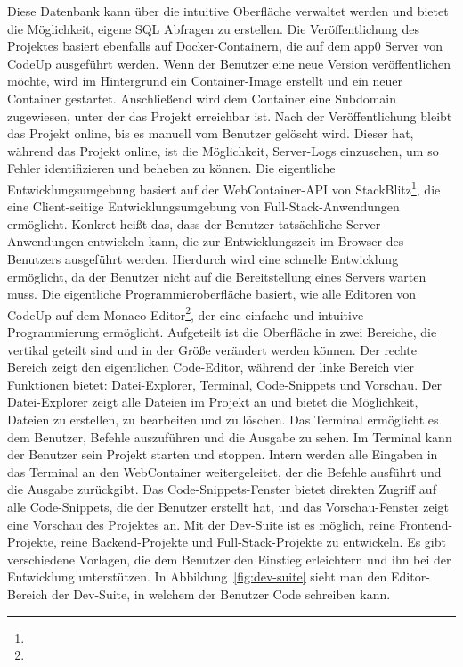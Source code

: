 \documentclass[main.tex]{subfiles}
\begin{document}
    Diese Datenbank kann über die intuitive Oberfläche verwaltet werden und bietet die Möglichkeit, eigene SQL Abfragen zu erstellen.
    Die Veröffentlichung des Projektes basiert ebenfalls auf Docker-Containern, die auf dem app0 Server von CodeUp ausgeführt werden.
    Wenn der Benutzer eine neue Version veröffentlichen möchte, wird im Hintergrund ein Container-Image erstellt und ein neuer Container gestartet.
    Anschließend wird dem Container eine Subdomain zugewiesen, unter der das Projekt erreichbar ist.
    Nach der Veröffentlichung bleibt das Projekt online, bis es manuell vom Benutzer gelöscht wird.
    Dieser hat, während das Projekt online, ist die Möglichkeit, Server-Logs einzusehen, um so Fehler identifizieren und beheben zu können.
    Die eigentliche Entwicklungsumgebung basiert auf der WebContainer-API von StackBlitz\footnote{}, die eine Client-seitige Entwicklungsumgebung von Full-Stack-Anwendungen ermöglicht.
    Konkret heißt das, dass der Benutzer tatsächliche Server-Anwendungen entwickeln kann, die zur Entwicklungszeit im Browser des Benutzers ausgeführt werden.
    Hierdurch wird eine schnelle Entwicklung ermöglicht, da der Benutzer nicht auf die Bereitstellung eines Servers warten muss.
    Die eigentliche Programmieroberfläche basiert, wie alle Editoren von CodeUp auf dem Monaco-Editor\footnote{}, der eine einfache und intuitive Programmierung ermöglicht.
    Aufgeteilt ist die Oberfläche in zwei Bereiche, die vertikal geteilt sind und in der Größe verändert werden können.
    Der rechte Bereich zeigt den eigentlichen Code-Editor, während der linke Bereich vier Funktionen bietet: Datei-Explorer, Terminal, Code-Snippets und Vorschau.
    Der Datei-Explorer zeigt alle Dateien im Projekt an und bietet die Möglichkeit, Dateien zu erstellen, zu bearbeiten und zu löschen.
    Das Terminal ermöglicht es dem Benutzer, Befehle auszuführen und die Ausgabe zu sehen.
    Im Terminal kann der Benutzer sein Projekt starten und stoppen.
    Intern werden alle Eingaben in das Terminal an den WebContainer weitergeleitet, der die Befehle ausführt und die Ausgabe zurückgibt.
    Das Code-Snippets-Fenster bietet direkten Zugriff auf alle Code-Snippets, die der Benutzer erstellt hat, und das Vorschau-Fenster zeigt eine Vorschau des Projektes an.
    Mit der Dev-Suite ist es möglich, reine Frontend-Projekte, reine Backend-Projekte und Full-Stack-Projekte zu entwickeln.
    Es gibt verschiedene Vorlagen, die dem Benutzer den Einstieg erleichtern und ihn bei der Entwicklung unterstützen.
    In Abbildung~\ref{fig:dev-suite} sieht man den Editor-Bereich der Dev-Suite, in welchem der Benutzer Code schreiben kann.
\end{document}
